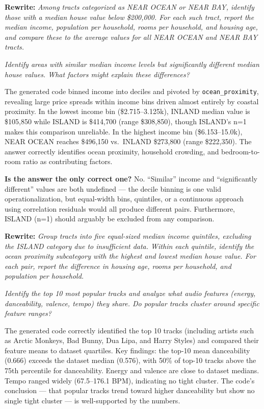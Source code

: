 \documentclass[12pt, oneside]{report}
\begin{document}
\textbf{Rewrite:} \textit{Among tracts categorized as NEAR OCEAN or NEAR BAY, identify those with a median house value below \$200,000. For each such tract, report the median income, population per household, rooms per household, and housing age, and compare these to the average values for all NEAR OCEAN and NEAR BAY tracts.}


\textit{Identify areas with similar median income levels but significantly different median house values. What factors might explain these differences?}

The generated code binned income into deciles and pivoted by \texttt{ocean\_proximity}, revealing large price spreads within income bins driven almost entirely by coastal proximity. In the lowest income bin (\$2.715--3.125k), INLAND median value is \$105,850 while ISLAND is \$414,700 (range \$308,850), though ISLAND's n=1 makes this comparison unreliable. In the highest income bin (\$6.153--15.0k), NEAR OCEAN reaches \$496,150 vs.\ INLAND \$273,800 (range \$222,350). The answer correctly identifies ocean proximity, household crowding, and bedroom-to-room ratio as contributing factors.

\textbf{Is the answer the only correct one?} No. ``Similar'' income and ``significantly different'' values are both undefined --- the decile binning is one valid operationalization, but equal-width bins, quintiles, or a continuous approach using correlation residuals would all produce different pairs. Furthermore, ISLAND (n=1) should arguably be excluded from any comparison.

\textbf{Rewrite:} \textit{Group tracts into five equal-sized median income quintiles, excluding the ISLAND category due to insufficient data. Within each quintile, identify the ocean proximity subcategory with the highest and lowest median house value. For each pair, report the difference in housing age, rooms per household, and population per household.}



\textit{Identify the top 10 most popular tracks and analyze what audio features (energy, danceability, valence, tempo) they share. Do popular tracks cluster around specific feature ranges?}

The generated code correctly identified the top 10 tracks (including artists such as Arctic Monkeys, Bad Bunny, Dua Lipa, and Harry Styles) and compared their feature means to dataset quartiles. Key findings: the top-10 mean danceability (0.666) exceeds the dataset median (0.576), with 50\% of top-10 tracks above the 75th percentile for danceability. Energy and valence are close to dataset medians. Tempo ranged widely (67.5--176.1 BPM), indicating no tight cluster. The code's conclusion --- that popular tracks trend toward higher danceability but show no single tight cluster --- is well-supported by the numbers.
\end{document}
